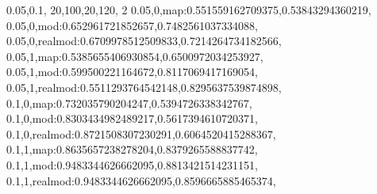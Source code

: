 0.05,0.1,
20,100,20,120,
2
0.05,0,map:0.551559162709375,0.53843294360219,
0.05,0,mod:0.652961721852657,0.7482561037334088,
0.05,0,realmod:0.6709978512509833,0.7214264734182566,
0.05,1,map:0.5385655406930854,0.6500972034253927,
0.05,1,mod:0.599500221164672,0.8117069417169054,
0.05,1,realmod:0.5511293764542148,0.8295637539874898,
0.1,0,map:0.732035790204247,0.5394726338342767,
0.1,0,mod:0.8303434982489217,0.5617394610720371,
0.1,0,realmod:0.8721508307230291,0.6064520415288367,
0.1,1,map:0.8635657238278204,0.8379265588837742,
0.1,1,mod:0.9483344626662095,0.8813421514231151,
0.1,1,realmod:0.9483344626662095,0.8596665885465374,
